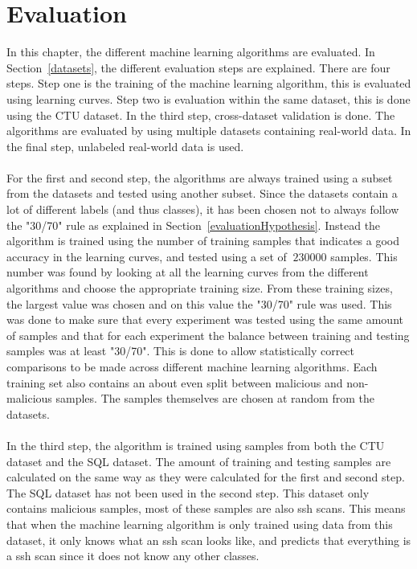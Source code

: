
\chapter{Evaluation} %

\label{evaluation} %

In this chapter, the different machine learning algorithms are evaluated. In Section~\ref{datasets}, the different evaluation steps are explained. There are four steps. Step one is the training of the machine learning algorithm, this is evaluated using learning curves. Step two is evaluation within the same dataset, this is done using the CTU dataset. In the third step, cross-dataset validation is done. The algorithms are evaluated by using multiple datasets containing real-world data. In the final step, unlabeled real-world data is used. \\
\\
For the first and second step, the algorithms are always trained using a subset from the datasets and tested using another subset. Since the datasets contain a lot of different labels (and thus classes), it has been chosen not to always follow the "30/70" rule as explained in Section~\ref{evaluationHypothesis}. Instead the algorithm is trained using the number of training samples that indicates a good accuracy in the learning curves, and tested using a set of $~230000$ samples. This number was found by looking at all the learning curves from the different algorithms and choose the appropriate training size. From these training sizes, the largest value was chosen and on this value the "30/70" rule was used. This was done to make sure that every experiment was tested using the same amount of samples and that for each experiment the balance between training and testing samples was at least "30/70". This is done to allow statistically correct comparisons to be made across different machine learning algorithms. Each training set also contains an about even split between malicious and non-malicious samples. The samples themselves are chosen at random from the datasets.\\
\\
In the third step, the algorithm is trained using samples from both the CTU dataset and the SQL dataset. The amount of training and testing samples are calculated on the same way as they were calculated for the first and second step. The SQL dataset has not been used in the second step. This dataset only contains malicious samples, most of these samples are also ssh scans. This means that when the machine learning algorithm is only trained using data from this dataset, it only knows what an ssh scan looks like, and predicts that everything is a ssh scan since it does not know any other classes. \\
